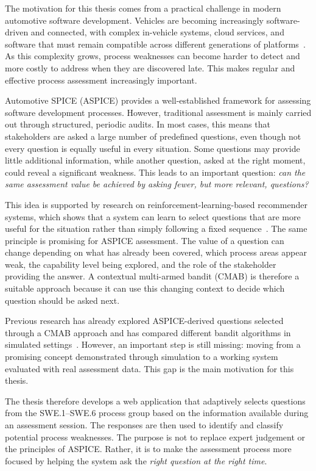 \documentclass[a4paper, 12pt, oneside, openany, BCOR1cm,toc=chapterentrywithdots]{scrbook}
\begin{document}
The motivation for this thesis comes from a practical challenge in modern automotive software
development. Vehicles are becoming increasingly software-driven and connected, with complex
in-vehicle systems, cloud services, and software that must remain compatible across different
generations of platforms~\cite{zhang2021canbus,furst2010challenges}. As this complexity grows,
process weaknesses can become harder to detect and more costly to address when they are
discovered late. This makes regular and effective process assessment increasingly important.

Automotive SPICE (ASPICE) provides a well-established framework for assessing software
development processes. However, traditional assessment is mainly carried out through structured,
periodic audits. In most cases, this means that stakeholders are asked a large number of
predefined questions, even though not every question is equally useful in every situation. Some
questions may provide little additional information, while another question, asked at the right
moment, could reveal a significant weakness. This leads to an important question: \emph{can the
same assessment value be achieved by asking fewer, but more relevant, questions?}

This idea is supported by research on reinforcement-learning-based recommender systems, which
shows that a system can learn to select questions that are more useful for the situation rather
than simply following a fixed sequence~\cite{datsogiannis2024early}. The same principle is
promising for ASPICE assessment. The value of a question can change depending on what has
already been covered, which process areas appear weak, the capability level being explored, and
the role of the stakeholder providing the answer. A contextual multi-armed bandit (CMAB) is
therefore a suitable approach because it can use this changing context to decide which question
should be asked next.

Previous research has already explored ASPICE-derived questions selected through a CMAB approach
and has compared different bandit algorithms in simulated
settings~\cite{datsogiannis2024early,datsogiannis2025recommender}. However, an important step is
still missing: moving from a promising concept demonstrated through simulation to a working
system evaluated with real assessment data. This gap is the main motivation for this thesis.

The thesis therefore develops a web application that adaptively selects questions from the
SWE.1--SWE.6 process group based on the information available during an assessment session. The
responses are then used to identify and classify potential process weaknesses. The purpose is
not to replace expert judgement or the principles of ASPICE. Rather, it is to make the assessment
process more focused by helping the system ask the \emph{right question at the right time}.
\end{document}
